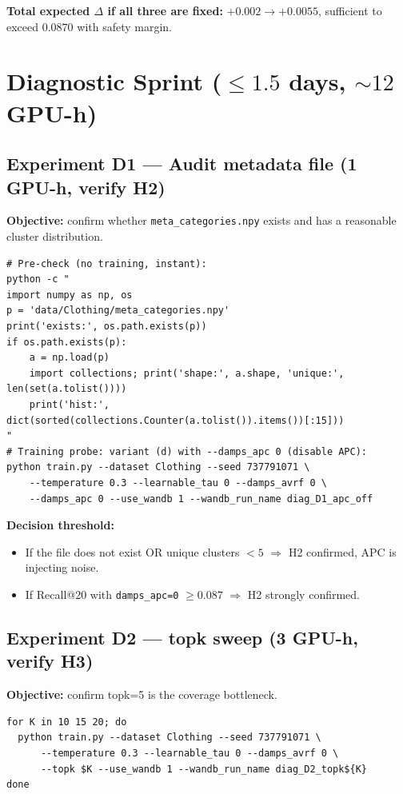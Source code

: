 \documentclass[11pt,a4paper]{article}
\begin{document}
\textbf{Total expected $\Delta$ if all three are fixed:} $+0.002 \to +0.0055$,
sufficient to exceed $0.0870$ with safety margin.

\section{Diagnostic Sprint ($\leq 1.5$ days, $\sim 12$ GPU-h)}

\subsection*{Experiment D1 --- Audit metadata file (1 GPU-h, verify H2)}

\textbf{Objective:} confirm whether \texttt{meta\_categories.npy} exists and
has a reasonable cluster distribution.

\begin{lstlisting}[style=bashstyle]
# Pre-check (no training, instant):
python -c "
import numpy as np, os
p = 'data/Clothing/meta_categories.npy'
print('exists:', os.path.exists(p))
if os.path.exists(p):
    a = np.load(p)
    import collections; print('shape:', a.shape, 'unique:', len(set(a.tolist())))
    print('hist:', dict(sorted(collections.Counter(a.tolist()).items())[:15]))
"
# Training probe: variant (d) with --damps_apc 0 (disable APC):
python train.py --dataset Clothing --seed 737791071 \
    --temperature 0.3 --learnable_tau 0 --damps_avrf 0 \
    --damps_apc 0 --use_wandb 1 --wandb_run_name diag_D1_apc_off
\end{lstlisting}

\textbf{Decision threshold:}
\begin{itemize}[leftmargin=*]
    \item If the file does not exist OR unique clusters $< 5$ $\Rightarrow$ H2 confirmed, APC is injecting noise.
    \item If Recall@20 with \texttt{damps\_apc=0} $\geq 0.087$ $\Rightarrow$ H2 strongly confirmed.
\end{itemize}

\subsection*{Experiment D2 --- topk sweep (3 GPU-h, verify H3)}

\textbf{Objective:} confirm topk=5 is the coverage bottleneck.

\begin{lstlisting}[style=bashstyle]
for K in 10 15 20; do
  python train.py --dataset Clothing --seed 737791071 \
      --temperature 0.3 --learnable_tau 0 --damps_avrf 0 \
      --topk $K --use_wandb 1 --wandb_run_name diag_D2_topk${K}
done
\end{lstlisting}
\end{document}
